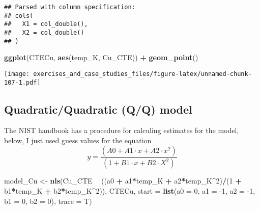 \documentclass[]{book}
\newenvironment{Shaded}{\begin{snugshade}}{\end{snugshade}}
\newcommand{\DataTypeTok}[1]{\textcolor[rgb]{0.13,0.29,0.53}{#1}}
\newcommand{\DecValTok}[1]{\textcolor[rgb]{0.00,0.00,0.81}{#1}}
\newcommand{\KeywordTok}[1]{\textcolor[rgb]{0.13,0.29,0.53}{\textbf{#1}}}
\newcommand{\NormalTok}[1]{#1}
\newcommand{\OperatorTok}[1]{\textcolor[rgb]{0.81,0.36,0.00}{\textbf{#1}}}
\newcommand{\StringTok}[1]{\textcolor[rgb]{0.31,0.60,0.02}{#1}}
\theoremstyle{definition}
\theoremstyle{definition}
\theoremstyle{definition}
\theoremstyle{remark}
\begin{document}
\begin{verbatim}
## Parsed with column specification:
## cols(
##   X1 = col_double(),
##   X2 = col_double()
## )
\end{verbatim}

\begin{Shaded}
\end{Shaded}

\begin{Shaded}
\begin{Highlighting}[]
\KeywordTok{ggplot}\NormalTok{(CTECu, }\KeywordTok{aes}\NormalTok{(temp_K, Cu_CTE)) }\OperatorTok{+}\StringTok{ }
\StringTok{  }\KeywordTok{geom_point}\NormalTok{()}
\end{Highlighting}
\end{Shaded}

\texttt{[image: exercises\_and\_case\_studies\_files/figure-latex/unnamed-chunk-107-1.pdf]}

\hypertarget{quadraticquadratic-qq-model}{%
\subsection{Quadratic/Quadratic (Q/Q)
model}\label{quadraticquadratic-qq-model}}

The NIST handbook has a procedure for calculing estimates for the model,
below, I just used guess values for the equation \[
y = \frac{(A0 + A1 \cdot x + A2 \cdot x^2)}{(1 + B1\cdot x + B2 \cdot X^2)}
\]

\begin{Shaded}
\begin{Highlighting}[]
\NormalTok{model_Cu <-}\StringTok{ }\KeywordTok{nls}\NormalTok{(Cu_CTE }\OperatorTok{~}\StringTok{ }\NormalTok{((a0 }\OperatorTok{+}\StringTok{ }\NormalTok{a1}\OperatorTok{*}\NormalTok{temp_K }\OperatorTok{+}\StringTok{ }\NormalTok{a2}\OperatorTok{*}\NormalTok{temp_K}\OperatorTok{^}\DecValTok{2}\NormalTok{)}\OperatorTok{/}\NormalTok{(}\DecValTok{1} \OperatorTok{+}\StringTok{ }\NormalTok{b1}\OperatorTok{*}\NormalTok{temp_K }\OperatorTok{+}\StringTok{ }\NormalTok{b2}\OperatorTok{*}\NormalTok{temp_K}\OperatorTok{^}\DecValTok{2}\NormalTok{)), }
\NormalTok{            CTECu, }\DataTypeTok{start =} \KeywordTok{list}\NormalTok{(}\DataTypeTok{a0 =} \DecValTok{0}\NormalTok{, }\DataTypeTok{a1 =} \DecValTok{-1}\NormalTok{, }\DataTypeTok{a2 =} \DecValTok{-1}\NormalTok{, }\DataTypeTok{b1 =} \DecValTok{0}\NormalTok{, }\DataTypeTok{b2 =} \DecValTok{0}\NormalTok{), }\DataTypeTok{trace =}\NormalTok{ T)}
\end{Highlighting}
\end{Shaded}
\end{document}
